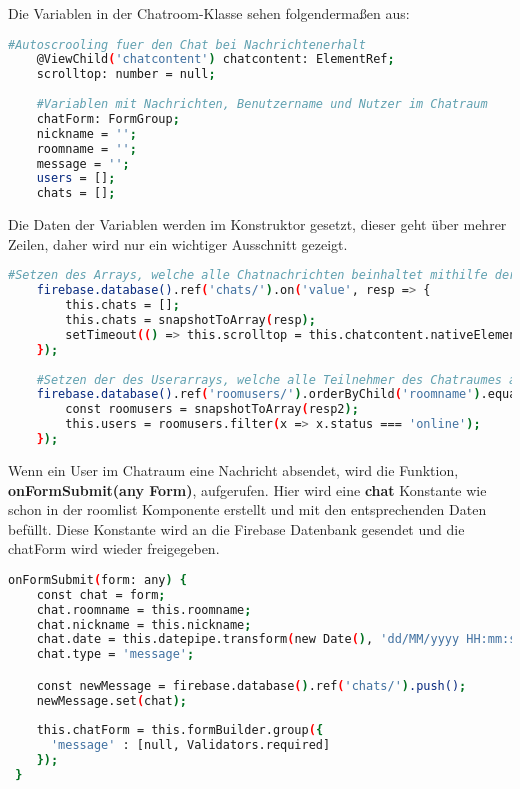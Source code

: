 Die Variablen in der Chatroom-Klasse sehen folgendermaßen aus:

\begin{lstlisting}[language=bash]
    #Autoscrooling fuer den Chat bei Nachrichtenerhalt
    @ViewChild('chatcontent') chatcontent: ElementRef;
    scrolltop: number = null;
  
    #Variablen mit Nachrichten, Benutzername und Nutzer im Chatraum
    chatForm: FormGroup;
    nickname = '';
    roomname = '';
    message = '';
    users = [];
    chats = [];
\end{lstlisting}

Die Daten der Variablen werden im Konstruktor gesetzt, dieser geht über mehrer Zeilen, daher wird nur ein wichtiger Ausschnitt gezeigt.

\begin{lstlisting}[language=bash]
    #Setzen des Arrays, welche alle Chatnachrichten beinhaltet mithilfe der snapshot Konstante
    firebase.database().ref('chats/').on('value', resp => {
        this.chats = [];
        this.chats = snapshotToArray(resp);
        setTimeout(() => this.scrolltop = this.chatcontent.nativeElement.scrollHeight, 500);
    });
    
    #Setzen der des Userarrays, welche alle Teilnehmer des Chatraumes angibt
    firebase.database().ref('roomusers/').orderByChild('roomname').equalTo(this.roomname).on('value', (resp2: any) => {
        const roomusers = snapshotToArray(resp2);
        this.users = roomusers.filter(x => x.status === 'online');
    });
\end{lstlisting}

Wenn ein User im Chatraum eine Nachricht absendet, wird die Funktion, \textbf{onFormSubmit(any Form)}, aufgerufen.
Hier wird eine \textbf{chat} Konstante wie schon in der roomlist Komponente erstellt und mit den entsprechenden Daten befüllt. Diese Konstante wird an die Firebase Datenbank gesendet und die chatForm
wird wieder freigegeben.

\begin{lstlisting}[language=bash]
onFormSubmit(form: any) {
    const chat = form;
    chat.roomname = this.roomname;
    chat.nickname = this.nickname;
    chat.date = this.datepipe.transform(new Date(), 'dd/MM/yyyy HH:mm:ss');
    chat.type = 'message';

    const newMessage = firebase.database().ref('chats/').push();
    newMessage.set(chat);
    
    this.chatForm = this.formBuilder.group({
      'message' : [null, Validators.required]
    });
 }
\end{lstlisting}

\newpage